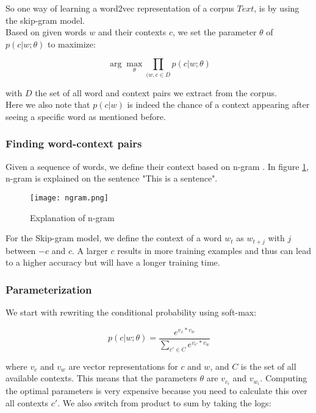 So one way of learning a word2vec representation of a corpus $Text$, is by using the skip-gram model. \\
Based on given words $w$ and their contexts $c$, we set the parameter $\theta$ of $p(c|w;\theta)$ to maximize:

\begin{equation} 
\arg \max_{\theta} \prod_{(w,c \in D} p(c|w;\theta)
\end{equation}

\noindent with $D$ the set of all word and context pairs we extract from the corpus.\\
Here we also note that $p(c|w)$ is indeed the chance of a context appearing after seeing a specific word as mentioned before.

\subsubsection{Finding word-context pairs}

Given a sequence of words, we define their context based on n-gram \cite{w2vNgram:article}. In figure \ref{fig:ngram}, n-gram is explained on the sentence "This is a sentence". 

\begin{figure}[htbp]
	\centering
	\texttt{[image: ngram.png]}
	\caption{Explanation of n-gram \cite{w2vNgram:online}}
	\label{fig:ngram}
\end{figure} 

For the Skip-gram model, we define the context of a word $w_t$ as $w_{t+j}$ with $j$ between $-c$ and $c$. A larger $c$ results in more training examples and thus can lead to a higher accuracy but will have a longer training time.


\subsubsection{Parameterization}

We start with rewriting the conditional probability using soft-max:

\begin{equation} 
p(c|w;\theta) = \frac{e^{v_x*v_w}}{\sum_{c' \in C}e^{v_{c'}*v_w}}
\end{equation}

\noindent where $v_c$ and $v_w$ are vector representations for $c$ and $w$, and $C$ is the set of all available contexts. This means that the parameters $\theta$ are $v_{c_i}$ and $v_{w_i}$. Computing the optimal parameters is very expensive because you need to calculate this over all contexts $c'$. We also switch from product to sum by taking the logs:

